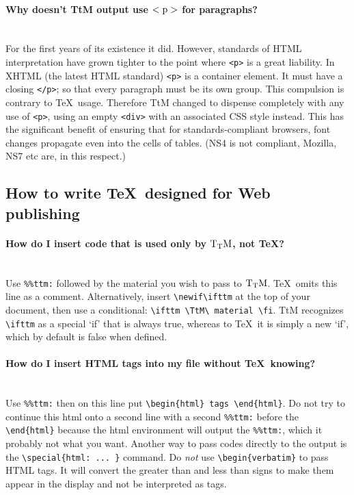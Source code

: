 \documentclass[12pt]{article}
\newif\ifttm
\def\TtM{$\rm{}T_TH$}
\def\TtM{$\rm{}T_TM$}%
\begin{document}
\paragraph{Why doesn't TtM output use $\rm <p>$ for paragraphs?}\leavevmode\\
 For the first years of its existence it
did. However, standards of HTML interpretation have grown tighter to
the point where \verb!<p>! is a great liability. In XHTML (the latest
HTML standard) \verb!<p>! is a container element. It must have a
closing \verb!</p>!; so that every paragraph must be its own
group. This compulsion is contrary to \TeX\ usage. Therefore TtM
changed to dispense completely with any use of \verb!<p>!, using an
empty \verb!<div>! with an associated CSS style instead. This has the
significant benefit of ensuring that for standards-compliant browsers,
font changes propagate even into the cells of tables. (NS4 is not
compliant, Mozilla, NS7 etc are, in this respect.)

\subsection{How to write \TeX\ designed for Web publishing}

\index{Tth@\TtM-only code}
\paragraph{How do I insert code that is used only by \TtM, not \TeX?}\leavevmode\\
Use \verb+%%ttm:+ followed by the material you wish to pass to \TtM.
\TeX\ omits this line as a comment. Alternatively, insert \verb|\newif\ifttm|
at the top of your document, then use a conditional:
\verb|\ifttm \TtM\ material \fi|. TtM recognizes \verb|\ifttm| as a
special `if' that is always true, whereas to \TeX\ it is simply a
new `if', which by default is false when defined.

\paragraph{How do I insert HTML tags into my file without \TeX\ knowing?}\leavevmode\\
Use \verb+%%ttm:+ then on this line put 
\verb+\begin{html} tags \end{html}+. Do not try to continue this
html onto a second line with a second \verb+%%ttm:+ before the
\verb+\end{html}+ because the html environment will output the
\verb+%%ttm:+, which it probably not what you want. Another way to
pass codes directly to the output is the \verb+\special{html: ... }+
command. Do
\emph{not} use \verb+\begin{verbatim}+ to pass HTML tags. It will
convert the greater than and less than signs to make them appear in
the display and not be interpreted as tags.
\end{document}
